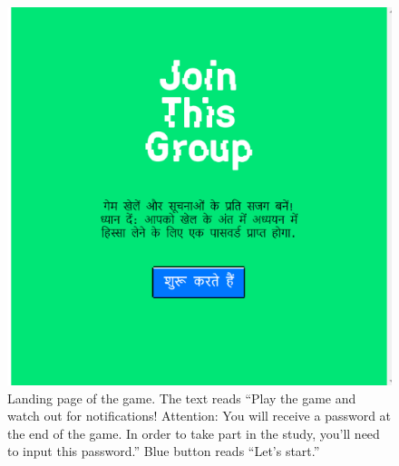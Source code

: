 \documentclass[empirical, authordate]{jote-new-article}
\begin{document}
\begin{figure}[t]

  \begin{fullwidth}
    \includegraphics[width=\linewidth]{media/image2.jpeg}
    \caption{Landing page of the game. The text reads “Play the game and watch out for notifications! Attention: You will receive a password at the end of the game. In order to take part in the study, you'll need to input this password.” Blue button reads “Let's start.” }
    \label{fig:figure2}
  \end{fullwidth}
\end{figure}
\end{document}
